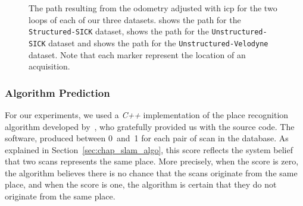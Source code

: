 \begin{figure}[H]
    \centering
    \caption[Path adjusted using \gls*{icp} for our three datasets.]{The path resulting from the odometry adjusted with \gls*{icp} for the two loops of each of our three datasets. \protect{} shows the path for the \texttt{Structured-SICK} dataset, \protect{} shows the path for the \texttt{Unstructured-SICK} dataset and \protect{} shows the path for the \texttt{Unstructured-Velodyne} dataset. Note that each marker represent the location of an acquisition.}
    \label{fig:chap_slam_results_paths}
\end{figure}


\subsubsection{Algorithm Prediction}
For our experiments, we used a \textit{C++} implementation of the place recognition algorithm developed by~\citet{Steder2011b}, who gratefully provided us with the source code. The software, produced between 0~and~1 for each pair of scan in the database. As explained in Section~\ref{sec:chap_slam_algo}, this score reflects the system belief that two scans represents the same place. More precisely, when the score is zero, the algorithm believes there is no chance that the scans originate from the same place, and when the score is one, the algorithm is certain that they do not originate from the same place.

